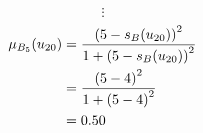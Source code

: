 \documentclass[a4paper]{book}
\begin{document}
				\[
					\vdots
				\]
				\begin{align}
					\mu_{B_5}(u_{20}) &= \frac{\left(5-s_B(u_{20})\right)^2}{1 + \left(5-s_B(u_{20})\right)^2}\\
					&= \frac{\left(5-4\right)^2}{1 + \left(5-4\right)^2} \notag \\
					&= 0.50 \notag
				\end{align}
				\\
				\\
\end{document}
